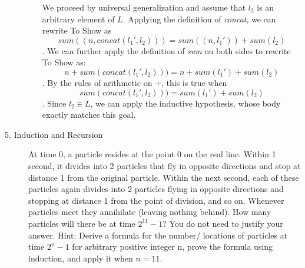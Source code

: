 \begin{description}
\begin{enumerate}
{\begin{itemize}
We proceed by universal generalization and assume that $l_2$ is an arbitrary element of $L$. Applying the definition of \textit{concat}, we can rewrite To Show as $$\textit{sum}((n, \textit{concat}(l_1', l_2))) = \textit{sum}((n, l_1')) + \textit{sum}(l_2)$$. We can further apply the definition of \textit{sum} on both sides to rewrite To Show as: $$n + \textit{sum}(\textit{concat}(l_1', l_2))) = n + \textit{sum}(l_1') + \textit{sum}(l_2)$$. By the rules of arithmetic on $+$, this is true when $$\textit{sum}(\textit{concat}(l_1', l_2))) = \textit{sum}(l_1') + \textit{sum}(l_2)$$. Since $l_2 \in L$, we can apply the inductive hypothesis, whose body exactly matches this goal.

\end{itemize}
}
\fi

\end{enumerate}


\item[5. Induction and Recursion] 
At time 0, a particle resides at the point 0 on the real line.  
Within 1 second, it divides into 2 particles that fly in opposite directions and 
stop at distance 1 from the original particle. Within the next second, 
each of these particles again divides into 2 particles flying in opposite directions 
and stopping at distance 1 from the point of division, and so on. 
Whenever particles meet they annihilate (leaving nothing behind). 
How many particles will there be at time $2^{11} -1$? 
You do not need to justify your answer. 
Hint: Derive a formula for the number/ locations of particles at time $2^n-1$ for arbitrary 
positive integer n, prove the formula using induction, and apply it when $n=11$.

\ifsolution
{}
\end{description}
